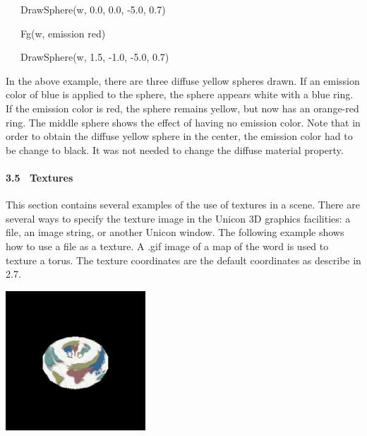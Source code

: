 \documentclass[letterpaper]{article}
\begin{document}
{\sffamily
\ \ \ DrawSphere(w, 0.0, 0.0, -5.0, 0.7)}

{\sffamily
\ \ \ Fg(w, {\textquotedbl}emission red{\textquotedbl})}

{\sffamily
\ \ \ DrawSphere(w, 1.5, -1.0, -5.0, 0.7) \ }


\bigskip

{
In the above example, there are three diffuse yellow spheres drawn. If an emission color of blue is applied to the
sphere, the sphere appears white with a blue ring. If the emission color is red, the sphere remains yellow, but now has
an orange-red ring. The middle sphere shows the effect of having no emission color. Note that in order to obtain the
diffuse yellow sphere in the center, the emission color had to be change to black. It was not needed to change the
diffuse material property.}

\paragraph[]{\bfseries }
\paragraph[3.5 \ Textures ]{\bfseries 3.5 \ Textures }

\bigskip

{
This section contains several examples of the use of textures in a scene. There are several ways to specify the texture
image in the Unicon 3D graphics facilities: a file, an image string, or another Unicon window. The following example
shows how to use a file as a texture. A .gif image of a map of the word is used to texture a torus. The texture
coordinates are the default coordinates as describe in 2.7. \ }


\bigskip

{\centering  \includegraphics[width=2.0583in,height=2.0583in]{utr9/utr9-img026.jpg} \par}
\end{document}
